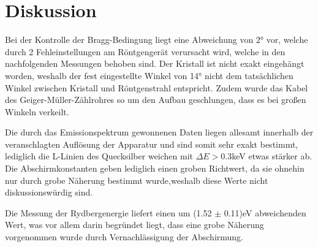 \section{Diskussion}
\label{sec:Diskussion}

Bei der Kontrolle der Bragg-Bedingung liegt eine Abweichung von $2 \si{\degree}$ vor, welche durch 2 Fehleinstellungen am Röntgengerät verursacht wird, welche in den nachfolgenden Messungen behoben sind. Der Kristall ist nicht exakt eingehängt worden, weshalb der fest eingestellte Winkel von 14° nicht dem tatsächlichen Winkel zwischen Kristall und Röntgenstrahl entspricht. Zudem wurde das Kabel des Geiger-Müller-Zählrohres so um den Aufbau geschlungen, dass es bei großen Winkeln verkeilt.

Die durch das Emissionspektrum gewonnenen Daten liegen allesamt innerhalb der veranschlagten Auflösung der Apparatur und sind somit sehr exakt bestimmt, lediglich die L-Linien des Quecksilber weichen mit $\Delta E > 0.3$keV etwas stärker ab. Die Abschirmkonstanten geben lediglich einen groben Richtwert, da sie ohnehin nur durch grobe Näherung bestimmt wurde,weshalb diese Werte nicht diskussionswürdig sind.

Die Messung der Rydbergenergie liefert einen um (1.52 $\pm$ 0.11)eV abweichenden Wert, was vor allem darin begründet liegt, dass eine grobe Näherung vorgenommen wurde durch Vernachlässigung der Abschirmung.
